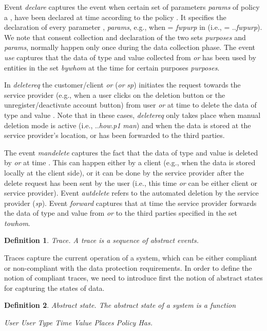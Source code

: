 \documentclass[a4paper]{article}
\newtheorem{ttd}{Definition}
\begin{document}
Event \textit{declare} captures the event when certain set of parameters \textit{params} of policy a ,  have been declared at time  according to the policy . It specifies the declaration of  every parameter ,   \textit{params}, e.g., when  = \textit{fwpurp} in  (i.e.,  = ..\textit{fwpurp}).  We note that consent collection and declaration of the two sets \textit{purposes} and \textit{params}, normally happen only once during the data collection phase. The event \textit{use} captures that the data of type  and value  collected from   \textit{or} has been used  by entities in the set \textit{bywhom} at the time  for certain purposes \textit{purposes}.    

In \textit{deletereq} the customer/client \textit{or} (\textit{or}  \textit{sp}) initiates the request towards the service provider (e.g., when a user clicks on the deletion button or the unregister/deactivate account button) from user \textit{or} at time  to delete the data of type  and value .  Note that in these cases,  \textit{deletereq} only takes place when manual deletion mode is active (i.e., ..\textit{how}.\textit{p1}  \textit{man}) and when the data is stored at the service provider's location, or has been forwarded to the third parties.

The event 
\textit{mandelete} captures the fact that the data of type  and value  is deleted by \textit{or} at time . This can happen either by a client (e.g., when the data is stored locally at the client side), or it can be done by the service provider after the delete request has been sent by the user (i.e., this time \textit{or} can be either client or service provider).  Event \textit{autdelete} refers to the automated deletion by the service provider (\textit{sp}). Event 
\textit{forward} captures that at time  the service provider forwards the data of type  and value  from \textit{or} to the third parties specified in the set \textit{towhom}. 


\begin{ttd} Trace. 
A trace  is a sequence of abstract events.  
\end{ttd}

Traces capture the current operation of a system, which can be either compliant or non-compliant with the data protection requirements.     
In order to define the notion of compliant traces, we need to introduce first the notion of abstract states for capturing the states of data.        

\begin{ttd} Abstract state.
The abstract state of a system is a function 

\noindent   \textit{User}  \textit{User}  \textit{Type} 
 \textit{Time}  \textit{Value}  \textit{Places}  \textit{Policy}  \textit{Has}. 
\end{ttd}
\end{document}
